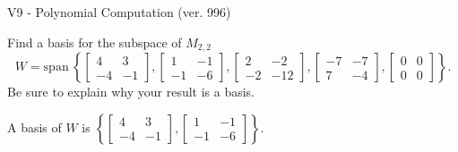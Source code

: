 \begin{exercise}
  \begin{exerciseTitle}V9 - Polynomial Computation (ver. 996)\end{exerciseTitle}
  \begin{exerciseStatement}
    Find a basis for the subspace of \(M_{2,2}\) 
\[W=\mathrm{span}\ \left\{\left[\begin{array}{cc}
4 & 3 \\
-4 & -1
\end{array}\right] , \left[\begin{array}{cc}
1 & -1 \\
-1 & -6
\end{array}\right] , \left[\begin{array}{cc}
2 & -2 \\
-2 & -12
\end{array}\right] , \left[\begin{array}{cc}
-7 & -7 \\
7 & -4
\end{array}\right] , \left[\begin{array}{cc}
0 & 0 \\
0 & 0
\end{array}\right]\right\}.\]
 Be sure to explain why your result is a basis.


  \end{exerciseStatement}
  \begin{exerciseAnswer}
   A basis of \(W\) is  \(\left\{\left[\begin{array}{cc}
4 & 3 \\
-4 & -1
\end{array}\right] , \left[\begin{array}{cc}
1 & -1 \\
-1 & -6
\end{array}\right]\right\}\).
  


  \end{exerciseAnswer}
\end{exercise}